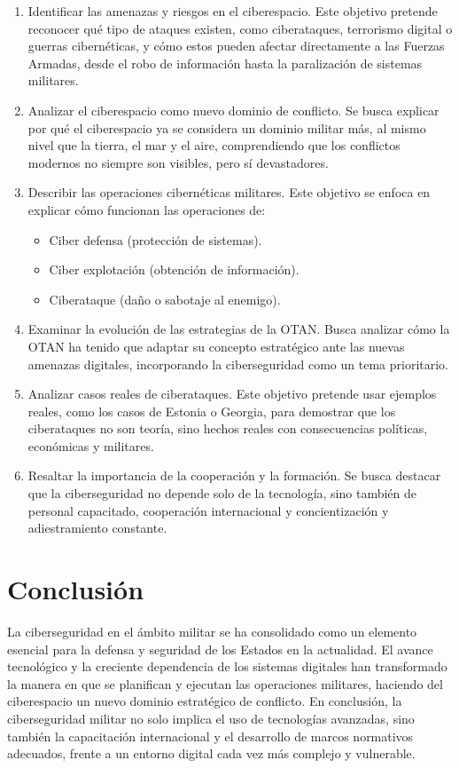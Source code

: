 \documentclass[12pt]{article}
\begin{document}
\begin{enumerate}
    \item Identificar las amenazas y riesgos en el ciberespacio.  
    Este objetivo pretende reconocer qué tipo de ataques existen, como ciberataques, terrorismo digital o guerras cibernéticas, y cómo estos pueden afectar directamente a las Fuerzas Armadas, desde el robo de información hasta la paralización de sistemas militares.

    \item Analizar el ciberespacio como nuevo dominio de conflicto.  
    Se busca explicar por qué el ciberespacio ya se considera un dominio militar más, al mismo nivel que la tierra, el mar y el aire, comprendiendo que los conflictos modernos no siempre son visibles, pero sí devastadores.

    \item Describir las operaciones cibernéticas militares.  
    Este objetivo se enfoca en explicar cómo funcionan las operaciones de:
    \begin{itemize}
        \item Ciber defensa (protección de sistemas).
        \item Ciber explotación (obtención de información).
        \item Ciberataque (daño o sabotaje al enemigo).
    \end{itemize}

    \item Examinar la evolución de las estrategias de la OTAN.  
    Busca analizar cómo la OTAN ha tenido que adaptar su concepto estratégico ante las nuevas amenazas digitales, incorporando la ciberseguridad como un tema prioritario.

    \item Analizar casos reales de ciberataques.  
    Este objetivo pretende usar ejemplos reales, como los casos de Estonia o Georgia, para demostrar que los ciberataques no son teoría, sino hechos reales con consecuencias políticas, económicas y militares.

    \item Resaltar la importancia de la cooperación y la formación.  
    Se busca destacar que la ciberseguridad no depende solo de la tecnología, sino también de personal capacitado, cooperación internacional y concientización y adiestramiento constante.
\end{enumerate}

\section{Conclusión}
La ciberseguridad en el ámbito militar se ha consolidado como un elemento esencial para la defensa y seguridad de los Estados en la actualidad. El avance tecnológico y la creciente dependencia de los sistemas digitales han transformado la manera en que se planifican y ejecutan las operaciones militares, haciendo del ciberespacio un nuevo dominio estratégico de conflicto. En conclusión, la ciberseguridad militar no solo implica el uso de tecnologías avanzadas, sino también la capacitación internacional y el desarrollo de marcos normativos adecuados, frente a un entorno digital cada vez más complejo y vulnerable.
\end{document}
